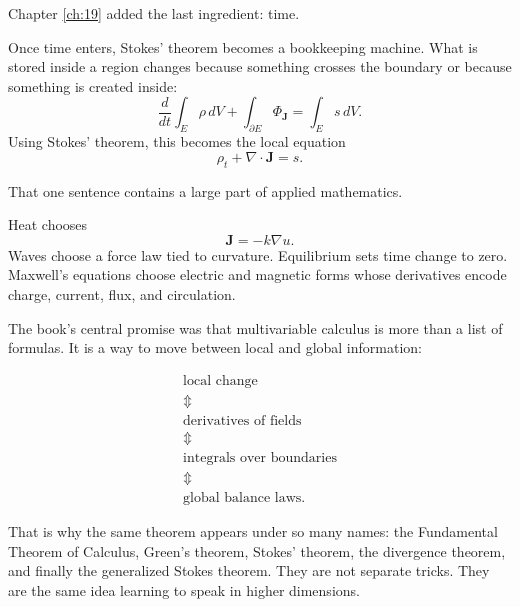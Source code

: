 Chapter \ref{ch:19} added the last ingredient: time.

Once time enters, Stokes' theorem becomes a bookkeeping machine.  What is stored
inside a region changes because something crosses the boundary or because something is
created inside:
\[
    \frac{d}{dt}\int_E \rho\,dV
    +
    \int_{\partial E}\Phi_{\mathbf J}
    =
    \int_E s\,dV.
\]
Using Stokes' theorem, this becomes the local equation
\[
    \rho_t+\nabla\cdot\mathbf J=s.
\]

That one sentence contains a large part of applied mathematics.

Heat chooses
\[
    \mathbf J=-k\nabla u.
\]
Waves choose a force law tied to curvature.  Equilibrium sets time change to zero.
Maxwell's equations choose electric and magnetic forms whose derivatives encode
charge, current, flux, and circulation.

The book's central promise was that multivariable calculus is more than a list of
formulas.  It is a way to move between local and global information:

\[
\boxed{
\begin{array}{c}
\text{local change}\\
\Updownarrow\\
\text{derivatives of fields}\\
\Updownarrow\\
\text{integrals over boundaries}\\
\Updownarrow\\
\text{global balance laws.}
\end{array}
}
\]

That is why the same theorem appears under so many names: the Fundamental Theorem
of Calculus, Green's theorem, Stokes' theorem, the divergence theorem, and finally the
generalized Stokes theorem.  They are not separate tricks.  They are the same idea
learning to speak in higher dimensions.